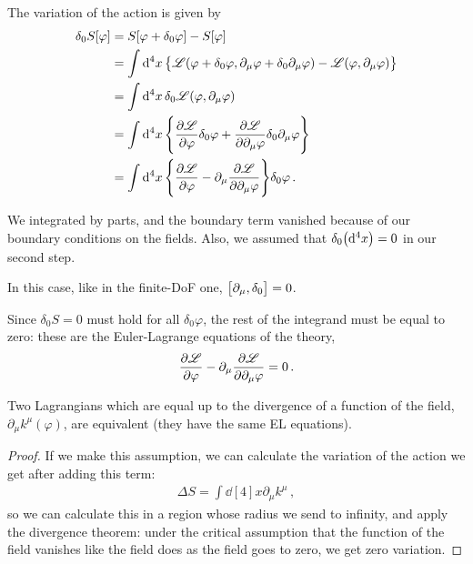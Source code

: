 \documentclass[main.tex]{subfiles}
\begin{document}
The variation of the action is given by 
%
\begin{align}
\delta_0 S [\varphi ] &= S [ \varphi + \delta_0 \varphi ] - S[\varphi ]  \\
&= \int \dd[4]{x} \qty{ \mathscr{L} (\varphi + \delta_0 \varphi , \partial_{\mu } \varphi + \delta_0 \partial_{\mu } \varphi ) - \mathscr{L} (\varphi, \partial_{\mu } \varphi )}  \\
&= \int \dd[4]{x } \delta_0 \mathscr{L} (\varphi , \partial_{\mu }\varphi )  \\
&= \int \dd[4]{x} 
\qty{ \pdv{\mathscr{L}}{\varphi } \delta_0 \varphi  + \pdv{\mathscr{L}}{\partial_{\mu } \varphi } \delta_0\partial_{\mu }  \varphi  }  \\
&= \int \dd[4]{x} \qty{\pdv{\mathscr{L}}{\varphi } - \partial_{\mu }\pdv{\mathscr{L}}{\partial_{\mu } \varphi }} \delta_0 \varphi 
\,.
\end{align}

We integrated by parts, and the boundary term vanished because of our boundary conditions on the fields. 
Also, we assumed that \(\delta_0 \qty(\dd[4]{x}) =0 \) in our second step.

In this case, like in the finite-DoF one, \(\qty[\partial_{\mu }, \delta_0 ] =0\). 

Since \(\delta_0 S = 0\) must hold for all \(\delta_0 \varphi \), the rest of the integrand must be equal to zero: these are the Euler-Lagrange equations of the theory, 
%
\begin{align}
\pdv{\mathscr{L}}{\varphi } - \partial_{\mu }\pdv{\mathscr{L}}{\partial_{\mu } \varphi } =0
\,.
\end{align}


\begin{claim}
Two Lagrangians which are equal up to the divergence of a function of the field, \(\partial_{\mu } k^{\mu }(\varphi )\), are equivalent (they have the same EL equations).
\end{claim} 

\begin{proof}

If we make this assumption, we can calculate the variation of the action we get after adding this term:
%
\begin{align}
\Delta S = \int \dd[4]{x} \partial_{\mu } k^{\mu } 
\,,
\end{align}
%
so we can calculate this in a region whose radius we send to infinity, and apply the divergence theorem: under the critical assumption that the function of the field vanishes like the field does as the field goes to zero, we get zero variation.
\end{proof}
\end{document}
